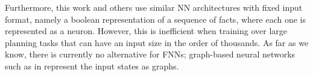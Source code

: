 

Furthermore, this work and others \cite{Ferber.etal/2020a, Ferber.etal/2022, OToole/2022} use similar NN architectures with fixed input format, namely a boolean representation of a sequence of facts, where each one is represented as a neuron. However, this is inefficient when training over large planning tasks that can have an input size in the order of thousands. As far as we know, there is currently no alternative for FNNs; graph-based neural networks such as in \citeyear{Shen.etal/2020} represent the input states as graphs.
